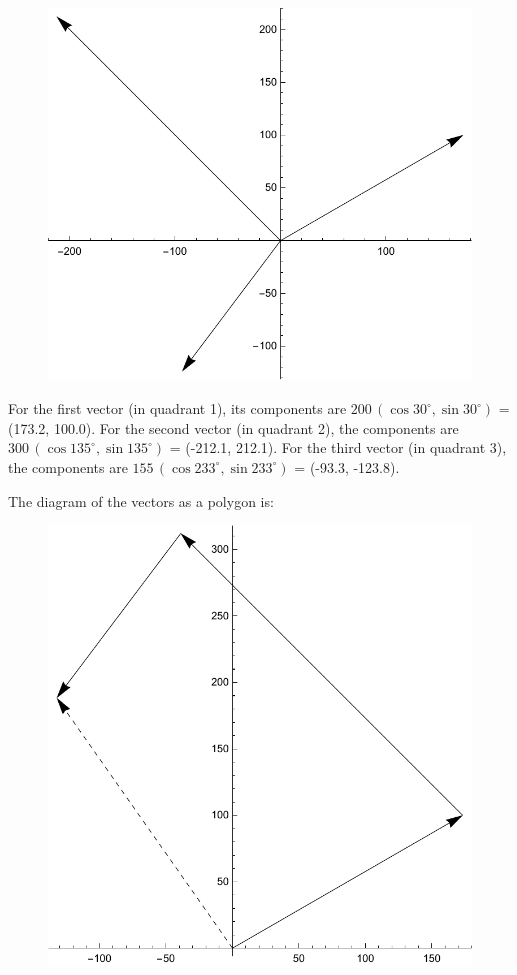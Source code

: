 \documentclass{amsart}
\begin{document}
\begin{figure}[h]
\includegraphics[scale=0.4]{2-4a}
\end{figure}

For the first vector (in quadrant 1), its components are $200\,(\cos 30^\circ, \sin 30^\circ)$ = (173.2, 100.0).
For the second vector (in quadrant 2), the components are $300\,(\cos 135^\circ, \sin 135^\circ)$ = (-212.1, 212.1).
For the third vector (in quadrant 3), the components are $155\,(\cos 233^\circ, \sin 233^\circ)$ = (-93.3, -123.8).

The diagram of the vectors as a polygon is:

\begin{figure}[h]
\includegraphics[scale=0.4]{2-4b}
\end{figure}
\end{document}
